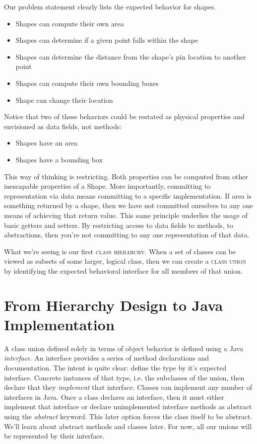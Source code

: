 \documentclass[]{tufte-handout}
\begin{document}
Our problem statement clearly lists the expected behavior for shapes. 
\begin{itemize}
\item Shapes can compute their own area
\item Shapes can determine if a given point falls within the shape
\item Shapes can determine the distance from the shape's pin location to another point
\item Shapes can compute their own bounding boxes
\item Shape can change their location
\end{itemize}
Notice that two of these behaviors could be restated as physical properties and envisioned as data fields, not methods:
\begin{itemize}
\item Shapes have an area
\item Shapes have a bounding box
\end{itemize}
This way of thinking is restricting.  Both properties can be computed from other inescapable properties of a Shape. More importantly, committing to representation via data means committing to a specific implementation.  If area is something returned by a shape, then we have not committed ourselves to any one means of achieving that return value. This same principle underlies the usage of basic getters and setters. By restricting access to data fields to methods, to abstractions, then you're not committing to any one representation of that data. 

What we're seeing is our first \textsc{class hierarchy}.  When a set of classes can be viewed as subsets of some larger, logical class, then we can create a \textsc{class union} by identifying the expected behavioral interface for all members of that union. 


\section{From Hierarchy Design to Java Implementation}

A class union defined solely in terms of object behavior is defined using a Java \textit{interface}. An interface provides a series of method declarations and documentation. The intent is quite clear: define the type by it's expected interface. Concrete instances of that type, i.e. the subclasses of the union, then declare that they \textit{implement} that interface.  Classes can implement any number of interfaces in Java. Once a class declares an interface, then it must either implement that interface or declare unimplemented interface methods as abstract using the \textit{abstract} keyword. This later option forces the class itself to be abstract. We'll learn about abstract methods and classes later. For now, all our unions will be represented by their interface. 
\end{document}
